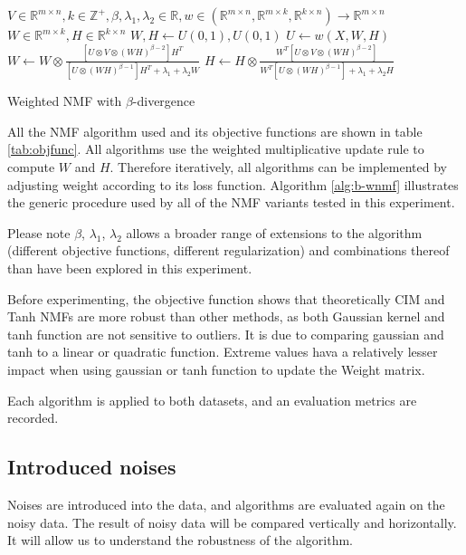 \documentclass{article} %
\begin{document}
\begin{algorithm}
\begin{algorithmic}
\REQUIRE $V \in \mathbb{R}^{m \times n}, k \in \mathbb{Z}^+, \beta,\lambda_1,\lambda_2 \in \mathbb{R},w \in \left(\mathbb{R}^{m \times n}, \mathbb{R}^{m \times k}, \mathbb{R}^{k \times n}\right) \to \mathbb{R}^{m \times n}$
\ENSURE $W \in \mathbb{R}^{m \times k}, H \in \mathbb{R}^{k \times n}$
\STATE $W,H \gets U\left(0,1\right),U\left(0,1\right)$
\REPEAT
  \STATE $U \gets w\left(X,W,H\right)$
  \STATE $W \gets W \otimes \frac{\left[U \otimes V \otimes \left(WH\right)^{\beta-2}\right] H^T}{\left[U \otimes \left(WH\right)^{\beta-1}\right]H^T + \lambda_1 + \lambda_2 W}$
  \STATE $H \gets H \otimes \frac{W^T \left[U \otimes V \otimes \left(WH\right)^{\beta-2}\right]}{W^T \left[U \otimes \left(WH\right)^{\beta-1}\right] + \lambda_1 + \lambda_2 H}$
\end{algorithmic}
\caption{Weighted NMF with $\beta$-divergence \label{alg:b-wnmf}}
\end{algorithm}

All the NMF algorithm used and its objective functions are shown in table \ref{tab:objfunc}. All algorithms use the weighted multiplicative update rule to compute $W$ and $H$. Therefore iteratively, all algorithms can be implemented by adjusting weight according to its loss function. \cite{arora} Algorithm \ref{alg:b-wnmf} illustrates the generic procedure used by all of the NMF variants tested in this experiment.

Please note $\beta$, $\lambda_1$, $\lambda_2$ allows a broader range of extensions to the algorithm (different objective functions, different regularization) and combinations thereof than have been explored in this experiment.

Before experimenting, the objective function shows that theoretically CIM and Tanh NMFs are more robust than other methods, as both Gaussian kernel and tanh function are not sensitive to outliers. It is due to comparing gaussian and tanh to a linear or quadratic function. Extreme values hava a relatively lesser impact when using gaussian or tanh function to update the Weight matrix. 

Each algorithm is applied to both datasets, and an evaluation metrics are recorded.

\subsection{Introduced noises}
Noises are introduced into the data, and algorithms are evaluated again on the noisy data. The result of noisy data will be compared vertically and horizontally. It will allow us to understand the robustness of the algorithm.
\end{document}
